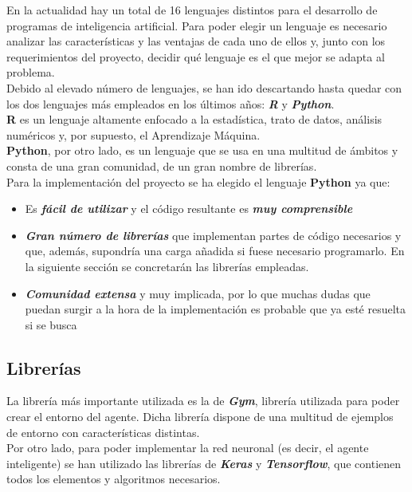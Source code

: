 En la actualidad hay un total de 16 lenguajes distintos para el desarrollo de programas de inteligencia artificial. Para poder elegir un lenguaje es necesario analizar las características y las ventajas de cada uno de ellos y, junto con los requerimientos del proyecto, decidir qué lenguaje es el que mejor se adapta al problema. \\

Debido al elevado número de lenguajes, se han ido descartando hasta quedar con los dos lenguajes más empleados en los últimos años: \textbf{\textit{R}} y \textbf{\textit{Python}}. \\

\textbf{R} es un lenguaje altamente enfocado a la estadística, trato de datos, análisis numéricos y, por supuesto, el Aprendizaje Máquina. \\

\textbf{Python}, por otro lado, es un lenguaje que se usa en una multitud de ámbitos y consta de una gran comunidad, de un gran nombre de librerías. \\

Para la implementación del proyecto se ha elegido el lenguaje \textbf{Python} ya que:

\begin{itemize}
    \item Es \textbf{\textit{fácil de utilizar}} y el código resultante es \textbf{\textit{muy comprensible}}
    \item \textbf{\textit{Gran número de librerías}} que implementan partes de código necesarios y que, además, supondría una carga añadida si fuese necesario programarlo. En la siguiente sección se concretarán las librerías empleadas.  
    \item \textbf{\textit{Comunidad extensa}} y muy implicada, por lo que muchas dudas que puedan surgir a la hora de la implementación es probable que ya esté resuelta si se busca 
\end{itemize}

\subsection{Librerías} 

La librería más importante utilizada es la de \textbf{\textit{Gym}}, librería utilizada para poder crear el entorno del agente. Dicha librería dispone de una multitud de ejemplos de entorno con características distintas. \\

Por otro lado, para poder implementar la red neuronal (es decir, el agente inteligente) se han utilizado las librerías de \textbf{\textit{Keras}} y \textbf{\textit{Tensorflow}}, que contienen todos los elementos y algoritmos necesarios. \\

